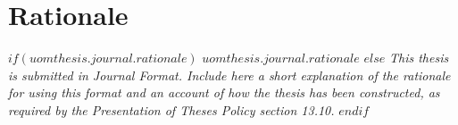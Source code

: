 \chapter*{Rationale}

$if(uomthesis.journal.rationale)$
$uomthesis.journal.rationale$
$else$
\emph{This thesis is submitted in Journal Format. Include here a short explanation of the rationale for using this format and an account of how the thesis has been constructed, as required by the Presentation of Theses Policy section 13.10.}
$endif$
